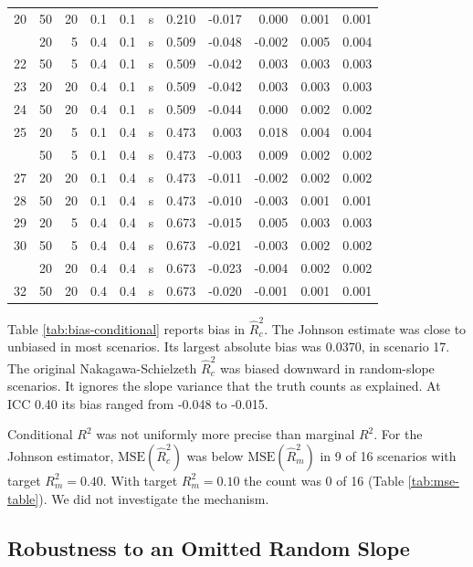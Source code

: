 \documentclass[
  11pt,
]{article}
\begin{document}
\begin{table}[!h]
{\begin{tabular}[t]{rrrrrlrrrrr}
20 & 50 & 20 & 0.1 & 0.1 & s & 0.210 & -0.017 & 0.000 & 0.001 & 0.001\\
\addlinespace
21 & 20 & 5 & 0.4 & 0.1 & s & 0.509 & -0.048 & -0.002 & 0.005 & 0.004\\
22 & 50 & 5 & 0.4 & 0.1 & s & 0.509 & -0.042 & 0.003 & 0.003 & 0.003\\
23 & 20 & 20 & 0.4 & 0.1 & s & 0.509 & -0.042 & 0.003 & 0.003 & 0.003\\
24 & 50 & 20 & 0.4 & 0.1 & s & 0.509 & -0.044 & 0.000 & 0.002 & 0.002\\
25 & 20 & 5 & 0.1 & 0.4 & s & 0.473 & 0.003 & 0.018 & 0.004 & 0.004\\
\addlinespace
26 & 50 & 5 & 0.1 & 0.4 & s & 0.473 & -0.003 & 0.009 & 0.002 & 0.002\\
27 & 20 & 20 & 0.1 & 0.4 & s & 0.473 & -0.011 & -0.002 & 0.002 & 0.002\\
28 & 50 & 20 & 0.1 & 0.4 & s & 0.473 & -0.010 & -0.003 & 0.001 & 0.001\\
29 & 20 & 5 & 0.4 & 0.4 & s & 0.673 & -0.015 & 0.005 & 0.003 & 0.003\\
30 & 50 & 5 & 0.4 & 0.4 & s & 0.673 & -0.021 & -0.003 & 0.002 & 0.002\\
\addlinespace
31 & 20 & 20 & 0.4 & 0.4 & s & 0.673 & -0.023 & -0.004 & 0.002 & 0.002\\
32 & 50 & 20 & 0.4 & 0.4 & s & 0.673 & -0.020 & -0.001 & 0.001 & 0.001\\
\bottomrule
\end{tabular}}
\end{table}

Table \ref{tab:bias-conditional} reports bias in \(\hat R^2_c\). The
Johnson estimate was close to unbiased in most scenarios. Its
largest absolute bias was
0.0370, in scenario
17. The original Nakagawa-Schielzeth
\(\hat R^2_c\) was biased downward in random-slope scenarios. It
ignores the slope variance that the truth counts as explained.
At ICC 0.40 its bias ranged from
-0.048 to
-0.015.

Conditional \(R^2\) was not uniformly more precise than marginal
\(R^2\). For the Johnson estimator, \(\text{MSE}(\hat R^2_c)\) was
below \(\text{MSE}(\hat R^2_m)\) in 9 of
16 scenarios with target \(R^2_m = 0.40\). With
target \(R^2_m = 0.10\) the count was 0 of
16 (Table \ref{tab:mse-table}). We did not
investigate the mechanism.

\subsection{Robustness to an Omitted Random Slope}\label{robustness-to-an-omitted-random-slope}
\end{document}

